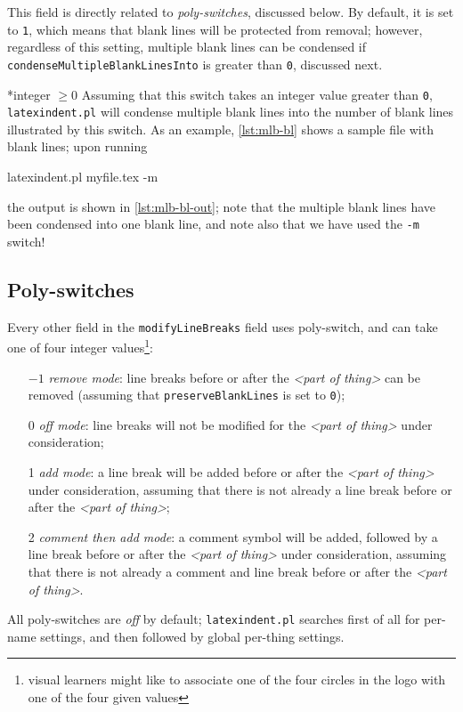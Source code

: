 This field is directly related to \emph{poly-switches}, discussed below. 
By default, it is set to \texttt{1}, which means that blank lines will 
be protected from removal; however, regardless of this setting, multiple 
blank lines can be condensed if \texttt{condenseMultipleBlankLinesInto} is
greater than \texttt{0}, discussed next.

*{integer $\geq 0$}
Assuming that this switch takes an integer value greater than \texttt{0}, \texttt{latexindent.pl} will condense multiple blank lines into
the number of blank lines illustrated by this switch. As an example, \cref{lst:mlb-bl} shows a sample file 
with blank lines; upon running
\begin{commandshell}
latexindent.pl myfile.tex -m  
\end{commandshell}
the output is shown in \cref{lst:mlb-bl-out}; note that the multiple blank lines have been 
condensed into one blank line, and note also that we have used the \texttt{-m} switch!

\begin{minipage}{.45\textwidth}
\end{minipage}%
\hfill
\begin{minipage}{.45\textwidth}
\end{minipage}

\subsection{Poly-switches}
Every other field in the \texttt{modifyLineBreaks} field uses poly-switch, and can take
one of four integer values\footnote{visual learners might like to associate one of the four circles in the logo with one of the four given values}:
\begin{itemize}[font=\bfseries]
  \item[$-1$] \emph{remove mode}: line breaks before or after the \emph{<part of thing>} can be removed (assuming that \texttt{preserveBlankLines} is set to \texttt{0});
  \item[0] \emph{off mode}: line breaks will not be modified for the \emph{<part of thing>} under consideration;
  \item[1] \emph{add mode}: a line break will be added before or after the \emph{<part of thing>} under consideration, assuming that
    there is not already a line break before or after the \emph{<part of thing>};
  \item[2] \emph{comment then add mode}: a comment symbol will be added, followed by a line break before or after the \emph{<part of thing>} under consideration, assuming that
    there is not already a comment and line break before or after the \emph{<part of thing>}.
\end{itemize}
All poly-switches are \emph{off} by default; \texttt{latexindent.pl} searches first of all for per-name settings, and then followed by global per-thing settings.

